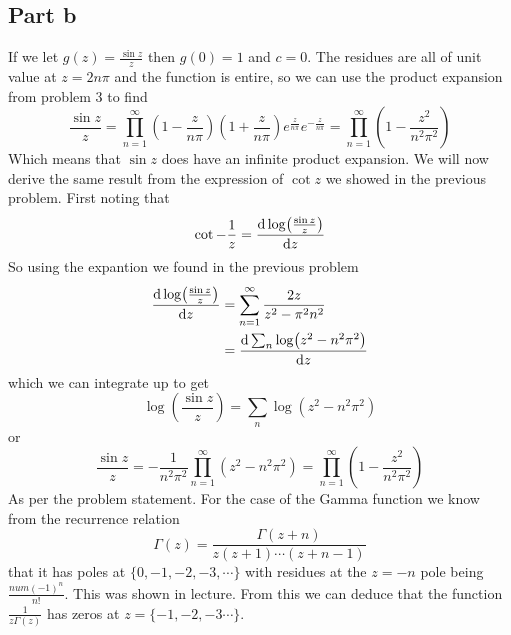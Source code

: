 \documentclass[a4paper,12pt]{article}
\begin{document}
\subsection*{Part b}
If we let $g(z)=\frac{\sin z}{z}$ then $g(0)=1$ and $c=0$. The residues are all of unit value at $z=2n\pi$ and the function is entire, so we can use the product expansion from problem 3 to find
\begin{equation}
\frac{\sin z}{z}=\prod_{n=1}^{\infty}\left(1-\frac{z}{n\pi}\right)\left(1+\frac{z}{n\pi}\right)e^{\frac{z}{n\pi}}e^{-\frac{z}{n\pi}}=\prod_{n=1}^{\infty}\left(1-\frac{z^2}{n^2\pi^2}\right)
\end{equation}
Which means that $\sin z$ does have an infinite product expansion. We will now derive the same result from the expression of $\cot z$ we showed in the previous problem. First noting that
\begin{equation}
\cot -\frac{1}{z}=\dv{\log(\frac{\sin z}{z})}{z}
\end{equation}
So using the expantion we found in the previous problem
\begin{equation}
\begin{aligned}
\dv{\log(\frac{\sin z}{z})}{z}&=\sum_{n=1}^{\infty}\frac{2z}{z^2-\pi^2 n^2}\\
&=\dv{\sum_{n}\log(z^2-n^2\pi^2)}{z}
\end{aligned}
\end{equation}
which we can integrate up to get
\begin{equation}
\log(\frac{\sin z}{z})=\sum_{n}\log(z^2-n^2\pi^2)
\end{equation}
or
\begin{equation}
\frac{\sin z}{z}=-\frac{1}{n^2\pi^2}\prod_{n=1}^{\infty}(z^2-n^2\pi^2)=\prod_{n=1}^{\infty}\left(1-\frac{z^2}{n^2\pi^2}\right)
\end{equation}
As per the problem statement. For the case of the Gamma function we know from the recurrence relation
\begin{equation}
\Gamma(z)=\frac{\Gamma(z+n)}{z(z+1)\cdots (z+n-1)}
\end{equation}
that it has poles at $\{0,-1,-2,-3,\cdots\}$ with residues at the $z=-n$ pole being $\frac{num(-1)^n}{n!}$. This was shown in lecture. From this we can deduce that the function $\frac{1}{z\Gamma(z)}$ has zeros at $z=\{-1,-2,-3\cdots\}$. 
\end{document}
